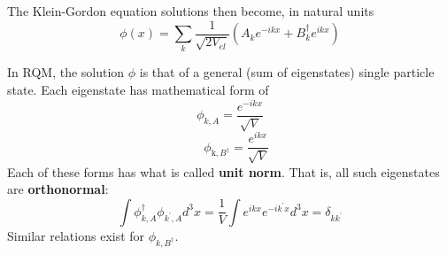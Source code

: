 The Klein-Gordon equation solutions then become, in natural units
\begin{equation}
\phi(x)=\sum_{k} \frac{1}{\sqrt{2 V_{e l}}}\left(A_{k} e^{-i k x}+B_{k}^{\dagger} e^{i k x}\right)
\end{equation}
\begin{mybox}
In RQM, the solution $\phi$ is that of a general (sum of eigenstates) single particle state. Each eigenstate has mathematical form of
$$
\phi_{k, A}=\frac{e^{-i k x}}{\sqrt{V}}
$$
$$
\quad \phi_{\mathrm{k}, B^{\dagger}}=\frac{e^{i k x}}{\sqrt{V}}
$$
Each of these forms has what is called \textbf{unit norm}. That is, all such eigenstates are \textbf{orthonormal}:
\begin{equation}
\int \phi_{k, A}^{\dagger} \phi_{k^{\prime},A} d^{3} x=\frac{1}{V} \int e^{i k x} e^{-i k^{\prime} x} d^{3} x=\delta_{k k^{\prime}}
\end{equation}
Similar relations exist for $\phi_{k, B^{\dagger}}$.
\end{mybox}

